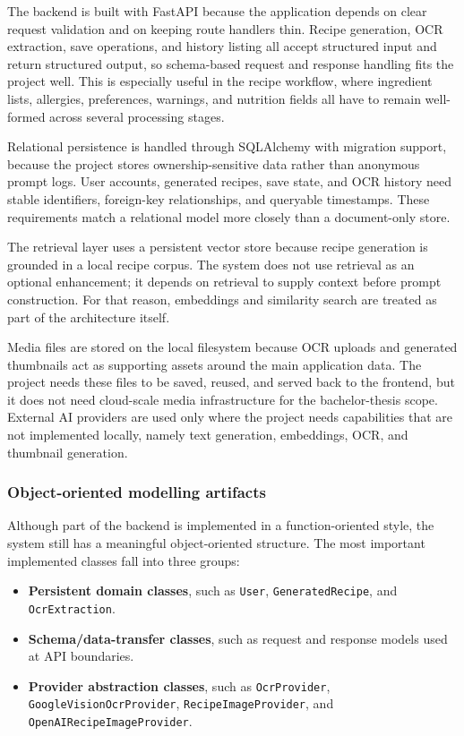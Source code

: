 The backend is built with FastAPI because the application depends on
clear request validation and on keeping route handlers thin. Recipe
generation, OCR extraction, save operations, and history listing all
accept structured input and return structured output, so schema-based
request and response handling fits the project well. This is especially
useful in the recipe workflow, where ingredient lists, allergies,
preferences, warnings, and nutrition fields all have to remain
well-formed across several processing stages.

Relational persistence is handled through SQLAlchemy with migration
support, because the project stores ownership-sensitive data rather than
anonymous prompt logs. User accounts, generated recipes, save state, and
OCR history need stable identifiers, foreign-key relationships, and
queryable timestamps. These requirements match a relational model more
closely than a document-only store.

The retrieval layer uses a persistent vector store because recipe
generation is grounded in a local recipe corpus. The system does not use
retrieval as an optional enhancement; it depends on retrieval to supply
context before prompt construction. For that reason, embeddings and
similarity search are treated as part of the architecture itself.

Media files are stored on the local filesystem because OCR uploads and
generated thumbnails act as supporting assets around the main
application data. The project needs these files to be saved, reused, and
served back to the frontend, but it does not need cloud-scale media
infrastructure for the bachelor-thesis scope. External AI providers are
used only where the project needs capabilities that are not implemented
locally, namely text generation, embeddings, OCR, and thumbnail
generation.

\subsubsection{Object-oriented modelling artifacts}

Although part of the backend is implemented in a function-oriented
style, the system still has a meaningful object-oriented structure. The
most important implemented classes fall into three groups:

\begin{itemize}
	\item \textbf{Persistent domain classes}, such as \texttt{User},
	\texttt{GeneratedRecipe}, and \texttt{OcrExtraction}.
	\item \textbf{Schema/data-transfer classes}, such as request and
	response models used at API boundaries.
	\item \textbf{Provider abstraction classes}, such as
	\texttt{OcrProvider}, \texttt{GoogleVisionOcrProvider},
	\texttt{RecipeImageProvider}, and
	\texttt{OpenAIRecipeImageProvider}.
\end{itemize}

